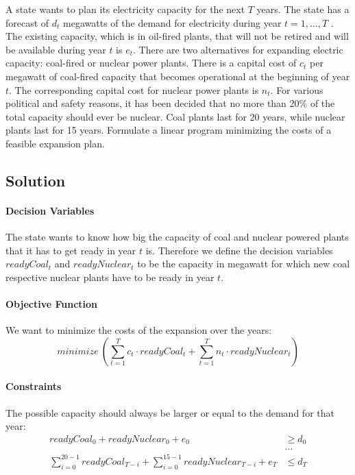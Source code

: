 \documentclass[a4paper, 12pt]{report}
\begin{document}
A state wants to plan its electricity capacity for the next $T$ years. The
state has a forecast of $d_t$ megawatts of the demand for electricity during
year $t = 1, …, T$ . The existing capacity, which is in oil-fired plants, that
will not be retired and will be available during year $t$ is $e_t$. There are
two alternatives for expanding electric capacity: coal-fired or nuclear power
plants. There is a capital cost of $c_t$ per megawatt of coal-fired capacity
that becomes operational at the beginning of year $t$. The corresponding
capital cost for nuclear power plants is $n_t$. For various political and
safety reasons, it has been decided that no more than 20\% of the total
capacity should ever be nuclear. Coal plants last for 20 years, while nuclear
plants last for 15 years. Formulate a linear program minimizing the costs of a
feasible expansion plan.

\subsection{Solution}

\paragraph{Decision Variables} The state wants to know how big the capacity of
coal and nuclear powered plants that it has to get ready in year $t$ is.
Therefore we define the decision variables $readyCoal_t$ and $readyNuclear_t$ to
be the capacity in megawatt for which new coal respective nuclear plants have to
be ready in year $t$.

\paragraph{Objective Function} We want to minimize the costs of the expansion
over the years:
\[
    minimize ~
    \left(
        ∑_{t=1}^{T} c_t · readyCoal_t + ∑_{t=1}^{T} n_t · readyNuclear_t
    \right)
\]

\paragraph{Constraints}

The possible capacity should always be larger or equal to the demand for that
year:
\begin{align*}
    readyCoal_0 + readyNuclear_0 + e_0      &≥ d_0\\
                                            &…\\
    ∑_{i=0}^{20-1} readyCoal_{T-i} +
    ∑_{i=0}^{15-1} readyNuclear_{T-i} + e_T &≤ d_T
\end{align*}
\end{document}
